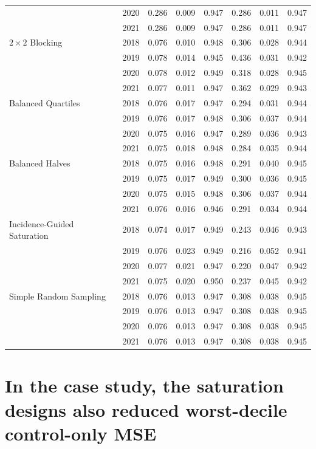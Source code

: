\documentclass[11pt]{article}
\begin{document}
\begin{table}[!htb]
\begin{tabular}{llrrrrrr}
 & 2020 & 0.286 & 0.009 & 0.947 & 0.286 & 0.011 & 0.947 \\
 & 2021 & 0.286 & 0.009 & 0.947 & 0.286 & 0.011 & 0.947 \\
\addlinespace
$2\times2$ Blocking & 2018 & 0.076 & 0.010 & 0.948 & 0.306 & 0.028 & 0.944 \\
 & 2019 & 0.078 & 0.014 & 0.945 & 0.436 & 0.031 & 0.942 \\
 & 2020 & 0.078 & 0.012 & 0.949 & 0.318 & 0.028 & 0.945 \\
 & 2021 & 0.077 & 0.011 & 0.947 & 0.362 & 0.029 & 0.943 \\
\addlinespace
Balanced Quartiles & 2018 & 0.076 & 0.017 & 0.947 & 0.294 & 0.031 & 0.944 \\
 & 2019 & 0.076 & 0.017 & 0.948 & 0.306 & 0.037 & 0.944 \\
 & 2020 & 0.075 & 0.016 & 0.947 & 0.289 & 0.036 & 0.943 \\
 & 2021 & 0.075 & 0.018 & 0.948 & 0.284 & 0.035 & 0.944 \\
\addlinespace
Balanced Halves & 2018 & 0.075 & 0.016 & 0.948 & 0.291 & 0.040 & 0.945 \\
 & 2019 & 0.075 & 0.017 & 0.949 & 0.300 & 0.036 & 0.945 \\
 & 2020 & 0.075 & 0.015 & 0.948 & 0.306 & 0.037 & 0.944 \\
 & 2021 & 0.076 & 0.016 & 0.946 & 0.291 & 0.034 & 0.944 \\
\addlinespace
Incidence-Guided Saturation & 2018 & 0.074 & 0.017 & 0.949 & 0.243 & 0.046 & 0.943 \\
 & 2019 & 0.076 & 0.023 & 0.949 & 0.216 & 0.052 & 0.941 \\
 & 2020 & 0.077 & 0.021 & 0.947 & 0.220 & 0.047 & 0.942 \\
 & 2021 & 0.075 & 0.020 & 0.950 & 0.237 & 0.045 & 0.942 \\
\addlinespace
Simple Random Sampling & 2018 & 0.076 & 0.013 & 0.947 & 0.308 & 0.038 & 0.945 \\
 & 2019 & 0.076 & 0.013 & 0.947 & 0.308 & 0.038 & 0.945 \\
 & 2020 & 0.076 & 0.013 & 0.947 & 0.308 & 0.038 & 0.945 \\
 & 2021 & 0.076 & 0.013 & 0.947 & 0.308 & 0.038 & 0.945 \\
\bottomrule
\end{tabular}
\end{table}


\FloatBarrier
\section{In the case study, the saturation designs also reduced worst-decile control-only MSE}\label{allocation-downside-and-sensitivity}
\end{document}
